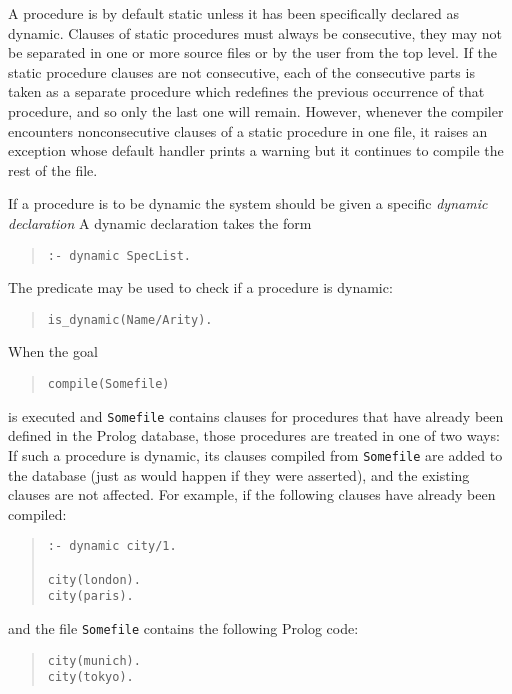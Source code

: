 A procedure is by default static unless it has been specifically declared as
dynamic.
Clauses of static procedures must always be consecutive,
they may not
be separated in one or more source files or by the user from the top level.
If the static procedure clauses are not consecutive, each of the
consecutive parts is taken as a separate procedure which redefines
the previous occurrence of that procedure, and so only the last one will
remain.
However, whenever the compiler encounters nonconsecutive clauses of a static
procedure in one file, it raises an exception whose default handler
prints a warning but it continues to compile the rest of the file.

If a procedure is to be dynamic the {\eclipse} system should be
given a specific {\it dynamic declaration}
A dynamic declaration takes the form
\begin{quote} \begin{verbatim}
:- dynamic SpecList.
\end{verbatim} \end{quote}
The predicate  may be used to check if a procedure
is dynamic:
\begin{quote} \begin{verbatim}
is_dynamic(Name/Arity).
\end{verbatim} \end{quote}
When the goal 
\begin{quote} \begin{verbatim}
compile(Somefile)
\end{verbatim} \end{quote}
is executed
and {\tt Somefile} contains clauses for procedures that have
already been defined
in the Prolog database, those procedures are treated in one of two ways:
If such a procedure is dynamic, its clauses compiled from {\tt Somefile}
are added to the database (just as would happen if they were asserted),
and the existing clauses are not affected.
For example, if the following
clauses have already been compiled:
\begin{quote}
\begin{verbatim}
:- dynamic city/1.

city(london).
city(paris).
\end{verbatim}
\end{quote}
and the file {\tt Somefile} contains the
following Prolog code:
\begin{quote}
\begin{verbatim}
city(munich).
city(tokyo).
\end{verbatim}
\end{quote}
